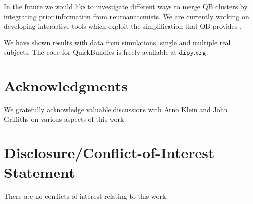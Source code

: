 \documentclass{bioinfo}
\begin{document}
In the future we would like to investigate different ways to merge QB
clusters by integrating prior information from neuroanatomists. We are
currently working on developing interactive tools which exploit the
simplification that QB provides \citep[see][]{GaryfallidisHBM2012}.

We have shown results with data from simulations, single and multiple
real subjects. The code for QuickBundles is freely available at
$\texttt{dipy.org}$.

\section*{Acknowledgments}
We gratefully acknowledge valuable discussions with Arno Klein and John
Griffiths on various aspects of this work.

\section*{Disclosure/Conflict-of-Interest Statement}
There are no conflicts of interest relating to this work.

%

%
%
%
%

\end{document}
